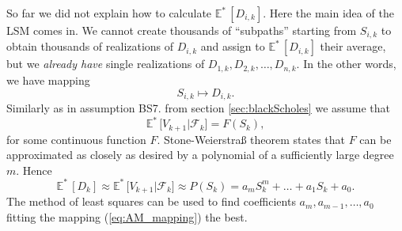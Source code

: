 \documentclass[a4paper,11pt, twoside]{book}
\theoremstyle{definition}
\theoremstyle{remark}
\def\Em{{\mathbb{E}^*}\,}
\begin{document}
So far we did not explain how to calculate $\Em[D_{i,k}]$. Here the main idea of the LSM comes in. We cannot create thousands of ``subpaths'' starting from $S_{i,k}$ to obtain thousands of realizations of $D_{i,k}$ and assign to $\Em[D_{i,k}]$ their average, but we \emph{already have} single realizations of $D_{1,k}, D_{2,k},\ldots, D_{n,k}$. In the other words, we have mapping
\begin{equation}
 \label{eq:AM_mapping}
  S_{i,k} \mapsto D_{i,k}.
\end{equation}
Similarly as in assumption BS7. from section \ref{sec:blackScholes} we assume that
\begin{equation*}
 \Em\bigl[ V_{k+1} | \mathcal{F}_{k} \bigr] = F(S_{k}),
\end{equation*}
for some continuous function $F$. Stone-Weierstra\ss{} theorem states that $F$ can be approximated as closely as desired by a polynomial of a sufficiently large degree $m$. Hence
\begin{equation*}
 \Em[D_{k}] \approx \Em\bigl[ V_{k+1} | \mathcal{F}_{k} \bigr] \approx P(S_{k}) = a_m S_{k}^m + \ldots + a_1 S_{k} + a_0.
\end{equation*}
The method of least squares can be used to find coefficients $a_m, a_{m-1},\ldots,a_0$ fitting the mapping (\ref{eq:AM_mapping}) the best.
\end{document}
